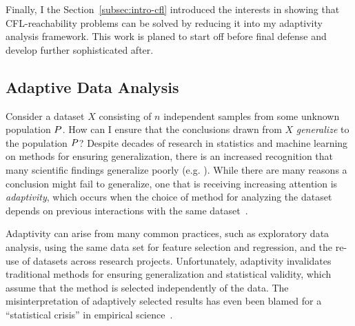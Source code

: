    Finally, I the Section~\ref*{subsec:intro-cfl} introduced the  interests in showing that
   CFL-reachability problems can be solved by reducing it into my adaptivity analysis framework. 
   This work is planed to start off before final defense and develop further sophisticated after.

\subsection{Adaptive Data Analysis}
\label{subsec:intro-motivation}


Consider a dataset $X$ consisting of $n$ independent samples from some unknown population $P$.  How can I ensure that the conclusions drawn from $X$ \emph{generalize} to the population $P$?  Despite decades of research in statistics and machine learning on methods for ensuring generalization, there is an increased recognition that many scientific findings generalize poorly (e.g. 
\cite{Ioannidis05,GelmanL13}
).  While there are many reasons a conclusion might fail to generalize, one that is receiving increasing attention is \emph{adaptivity}, which occurs when the choice of method for analyzing the dataset depends on previous interactions with the same dataset~\cite{GelmanL13}.

 Adaptivity can arise from many common practices, such as exploratory data analysis, using the same data set for feature selection and regression, and the re-use of datasets across research projects.  Unfortunately, adaptivity invalidates traditional methods for ensuring generalization and statistical validity, which assume that the method is selected independently of the data. The misinterpretation of adaptively selected results has even been blamed for a ``statistical crisis'' in empirical science~\cite{GelmanL13}.

